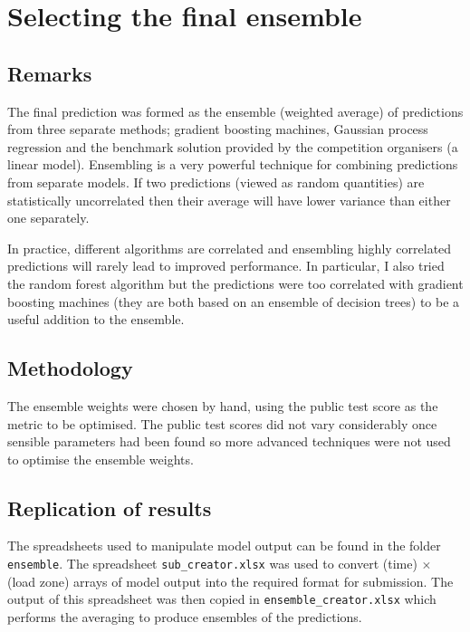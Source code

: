 \documentclass[final,authoryear,1p,times]{elsarticle}
\begin{document}
\section{Selecting the final ensemble}

\label{sec:ensemble}

\subsection{Remarks}

The final prediction was formed as the ensemble (weighted average) of predictions from three separate methods; gradient boosting machines, Gaussian process regression and the benchmark solution provided by the competition organisers (a linear model).
Ensembling is a very powerful technique for combining predictions from separate models.
If two predictions (viewed as random quantities) are statistically uncorrelated then their average will have lower variance than either one separately.

In practice, different algorithms are correlated and ensembling highly correlated predictions will rarely lead to improved performance.
In particular, I also tried the random forest algorithm but the predictions were too correlated with gradient boosting machines (they are both based on an ensemble of decision trees) to be a useful addition to the ensemble.

\subsection{Methodology}

The ensemble weights were chosen by hand, using the public test score as the metric to be optimised.
The public test scores did not vary considerably once sensible parameters had been found so more advanced techniques were not used to optimise the ensemble weights.

\subsection{Replication of results}

The spreadsheets used to manipulate model output can be found in the folder \texttt{ensemble}.
The spreadsheet \texttt{sub\_creator.xlsx} was used to convert (time) $\times$ (load zone) arrays of model output into the required format for submission.
The output of this spreadsheet was then copied in \texttt{ensemble\_creator.xlsx} which performs the averaging to produce ensembles of the predictions.
\end{document}
